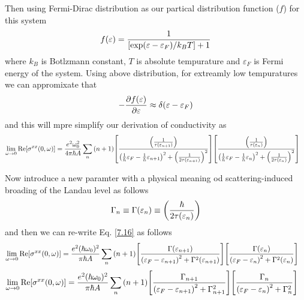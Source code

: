 \noindent
Then using Fermi-Dirac distribution as our partical distribution function ($f$) for this system
\begin{equation} \label{7.14}
  f(\varepsilon) = \frac{1}{\qty[\exp(\varepsilon - \varepsilon_F)/k_B T]+1}
\end{equation}
where $k_B$ is Botlzmann constant, $T$ is absolute tempurature and $\varepsilon_F$ is Fermi energy of the system. Using above distribution, for extreamly low tempuratures we can appromixate that
\begin{equation} \label{7.15}
  - \pdv{f(\varepsilon)}{\varepsilon} \approx \delta(\varepsilon - \varepsilon_F)
\end{equation}
and this will mpre simplify our derivation of conductivity as
\begin{equation} \label{7.16}
  \begin{aligned}
    \lim_{\omega \to 0}
    \text{Re}[{\sigma}^{xx}(0,\omega)] & =
    \frac{e^2 \omega_0^2}{4\pi\hbar A}
    \sum_{n}
    \qty(n+1)
    \qty[
    \frac{\qty(\frac{1}{\tau(\varepsilon_{n+1})})
    }
    {
    \qty(
    \frac{1}{\hbar}\varepsilon_F -
    \frac{1}{\hbar}\varepsilon_{n+1}
    )^2
    + \qty(\frac{1}{2\tau(\varepsilon_{n+1})})^2
    }]
    \qty[
    \frac{\qty(\frac{1}{\tau(\varepsilon_{n})})
    }
    {
    \qty(
    \frac{1}{\hbar}\varepsilon_F -
    \frac{1}{\hbar}\varepsilon_{n}
    )^2
    + \qty(\frac{1}{2\tau(\varepsilon_{n})})^2
    }]
  \end{aligned}
\end{equation}

\noindent
Now introduce a new paramter with a physical meaning od scattering-induced broading of the Landau level as follows
\begin{equation} \label{6.17}
  \Gamma_n \equiv\Gamma(\varepsilon_n) \equiv \qty(\frac{\hbar }{2\tau(\varepsilon_n)})
\end{equation}
and then we can re-write Eq. \eqref{7.16} as follows
\begin{equation} \label{7.18}
  \begin{aligned}
    \lim_{\omega \to 0}
    \text{Re}[{\sigma}^{xx}(0,\omega)] & =
    \frac{e^2 (\hbar\omega_0)^2}{\pi\hbar A}
    \sum_{n}
    \qty(n+1)
    \qty[
    \frac{\Gamma(\varepsilon_{n+1})
    }
    {
    \qty(
    \varepsilon_F - \varepsilon_{n+1}
    )^2
    + \Gamma^2(\varepsilon_{n+1})
    }]
    \qty[
    \frac{\Gamma(\varepsilon_{n})
    }
    {
    \qty(
    \varepsilon_F - \varepsilon_{n}
    )^2
    + \Gamma^2(\varepsilon_{n})
    }]
  \end{aligned}
\end{equation}
\begin{equation} \label{7.19}
  \begin{aligned}
    \lim_{\omega \to 0}
    \text{Re}[{\sigma}^{xx}(0,\omega)] & =
    \frac{e^2 (\hbar\omega_0)^2}{\pi\hbar A}
    \sum_{n}
    \qty(n+1)
    \qty[
    \frac{\Gamma_{n+1}
    }
    {
    \qty(
    \varepsilon_F - \varepsilon_{n+1}
    )^2
    + \Gamma^2_{n+1}
    }]
    \qty[
    \frac{\Gamma_{n}
    }
    {
    \qty(
    \varepsilon_F - \varepsilon_{n}
    )^2
    + \Gamma^2_{n}
    }]
  \end{aligned}
\end{equation}

